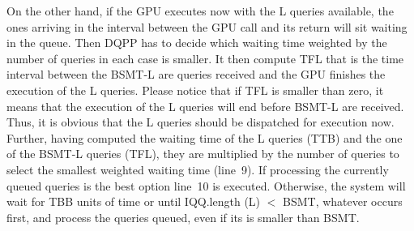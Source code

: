 On the other hand, if the GPU executes now with the L queries available, the ones arriving in the interval
between the GPU call and its return will sit waiting in the queue. Then DQPP has to decide which waiting time
weighted by the number of queries in each case is smaller. It then compute TFL that is the time interval
between the BSMT-L are queries received and the GPU finishes the execution of the L queries. Please
notice that if TFL is smaller than zero, it means that the execution of the L queries will end before BSMT-L are received. Thus, it is obvious that the L queries should be dispatched for execution
now. Further, having computed the waiting time of the L queries (TTB) and the one of the BSMT-L queries (TFL), they
are multiplied by the number of queries to select the smallest weighted waiting time (line~9). If processing the currently queued queries is the best option line~10 is executed. Otherwise, the system will
wait for TBB units of time or until IQQ.length (L) $<$ BSMT, whatever occurs first, and 
process the queries queued, even if its is smaller than BSMT.

